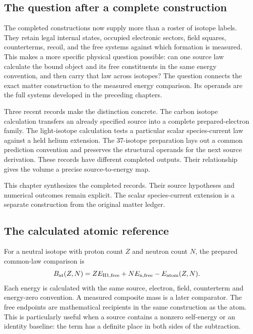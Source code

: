 \label{ch:common-map}

\subsection{The question after a complete construction}

The completed constructions now supply more than a roster of isotope labels. They retain legal internal states, occupied electronic sectors, field squares, counterterms, recoil, and the free systems against which formation is measured. This makes a more specific physical question possible: can one source law calculate the bound object and its free constituents in the same energy convention, and then carry that law across isotopes? The question connects the exact matter construction to the measured energy comparison. Its operands are the full systems developed in the preceding chapters.

Three recent records make the distinction concrete. The carbon isotope calculation transfers an already specified source into a complete prepared-electron family. The light-isotope calculation tests a particular scalar species-current law against a held helium extension. The 37-isotope preparation lays out a common prediction convention and preserves the structural operands for the next source derivation. These records have different completed outputs. Their relationship gives the volume a precise source-to-energy map.

This chapter synthesizes the completed records. Their source hypotheses and numerical outcomes remain explicit. The scalar species-current extension is a separate construction from the original matter ledger.

\subsection{The calculated atomic reference}

For a neutral isotope with proton count $Z$ and neutron count $N$, the prepared common-law comparison is
\begin{equation}
B_{\rm at}(Z,N)=Z E_{\mathrm{H1,free}}+N E_{\mathrm{n,free}}-E_{\rm atom}(Z,N).
\label{eq:atomic-binding-common}
\end{equation}
Each energy is calculated with the same source, electron, field, counterterm and energy-zero convention. A measured composite mass is a later comparator. The free endpoints are mathematical recipients in the same construction as the atom. This is particularly useful when a source contains a nonzero self-energy or an identity baseline: the term has a definite place in both sides of the subtraction.

